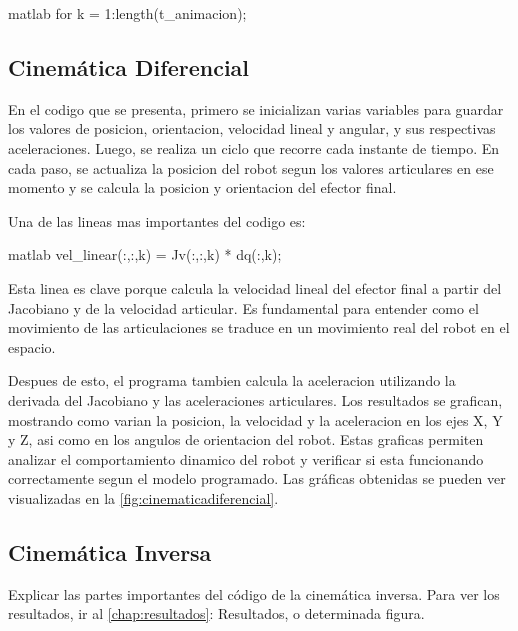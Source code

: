\begin{matlabcode}{matlab}
	for k = 1:length(t_animacion);
\end{matlabcode}


\subsection{Cinemática Diferencial}

En el codigo que se presenta, primero se inicializan varias variables para guardar los valores de posicion, orientacion, velocidad lineal y angular, y sus respectivas aceleraciones. Luego, se realiza un ciclo que recorre cada instante de tiempo. En cada paso, se actualiza la posicion del robot segun los valores articulares en ese momento y se calcula la posicion y orientacion del efector final.

Una de las lineas mas importantes del codigo es:
\begin{matlabcode}{matlab}
	vel_linear(:,:,k) = Jv(:,:,k) * dq(:,k);
\end{matlabcode}

Esta linea es clave porque calcula la velocidad lineal del efector final a partir del Jacobiano y de la velocidad articular. Es fundamental para entender como el movimiento de las articulaciones se traduce en un movimiento real del robot en el espacio.

Despues de esto, el programa tambien calcula la aceleracion utilizando la derivada del Jacobiano y las aceleraciones articulares. Los resultados se grafican, mostrando como varian la posicion, la velocidad y la aceleracion en los ejes X, Y y Z, asi como en los angulos de orientacion del robot. Estas graficas permiten analizar el comportamiento dinamico del robot y verificar si esta funcionando correctamente segun el modelo programado. Las gráficas obtenidas se pueden ver visualizadas en la  \autoref{fig:cinematicadiferencial}.

\subsection{Cinemática Inversa}
Explicar las partes importantes del código de la cinemática inversa.
Para ver los resultados, ir al \autoref{chap:resultados}: Resultados, o determinada figura.